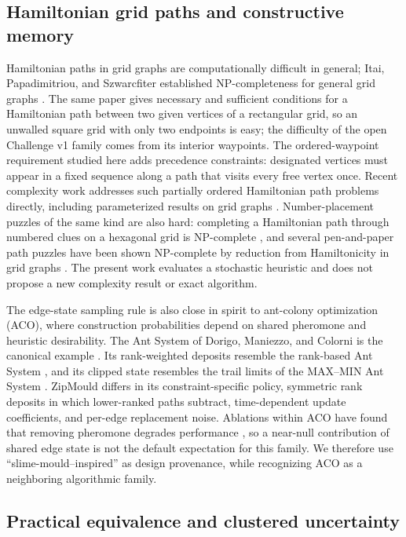 \documentclass[pdflatex,sn-basic,iicol]{sn-jnl}
\begin{document}
\subsection{Hamiltonian grid paths and constructive memory}

Hamiltonian paths in grid graphs are computationally difficult in general; Itai, Papadimitriou, and Szwarcfiter established NP-completeness for general grid graphs \citep{itai1982grid}. The same paper gives necessary and sufficient conditions for a Hamiltonian path between two given vertices of a rectangular grid, so an unwalled square grid with only two endpoints is easy; the difficulty of the open Challenge v1 family comes from its interior waypoints. The ordered-waypoint requirement studied here adds precedence constraints: designated vertices must appear in a fixed sequence along a path that visits every free vertex once. Recent complexity work addresses such partially ordered Hamiltonian path problems directly, including parameterized results on grid graphs \citep{beisegel2025partialorder}. Number-placement puzzles of the same kind are also hard: completing a Hamiltonian path through numbered clues on a hexagonal grid is NP-complete \citep{nguyen2022rikudo}, and several pen-and-paper path puzzles have been shown NP-complete by reduction from Hamiltonicity in grid graphs \citep{deurloo2024hamiltonian}. The present work evaluates a stochastic heuristic and does not propose a new complexity result or exact algorithm.

The edge-state sampling rule is also close in spirit to ant-colony optimization (ACO), where construction probabilities depend on shared pheromone and heuristic desirability. The Ant System of Dorigo, Maniezzo, and Colorni is the canonical example \citep{dorigo1996antsystem}. Its rank-weighted deposits resemble the rank-based Ant System \citep{bullnheimer1999rank}, and its clipped state resembles the trail limits of the MAX--MIN Ant System \citep{stutzle2000maxmin}. ZipMould differs in its constraint-specific policy, symmetric rank deposits in which lower-ranked paths subtract, time-dependent update coefficients, and per-edge replacement noise. Ablations within ACO have found that removing pheromone degrades performance \citep{dorigo1997acs,simon2025trail}, so a near-null contribution of shared edge state is not the default expectation for this family. We therefore use ``slime-mould--inspired'' as design provenance, while recognizing ACO as a neighboring algorithmic family.

\subsection{Practical equivalence and clustered uncertainty}
\end{document}
